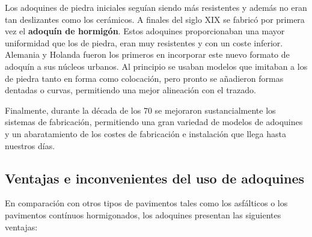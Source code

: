 Los adoquines de piedra iniciales seguían siendo más resistentes y además no eran tan deslizantes como los cerámicos. A finales del siglo XIX se fabricó por primera vez el \textbf{adoquín de hormigón}. Estos adoquines proporcionaban una mayor uniformidad que los de piedra, eran muy resistentes y con un coste inferior. Alemania y Holanda fueron los primeros en incorporar este nuevo formato de adoquín a sus núcleos urbanos. Al principio se usaban modelos que imitaban a los de piedra tanto en forma como colocación, pero pronto se añadieron formas dentadas o curvas, permitiendo una mejor alineación con el trazado.

Finalmente, durante la década de los 70 se mejoraron sustancialmente los sistemas de fabricación, permitiendo una gran variedad de modelos de adoquines y un abaratamiento de los costes de fabricación e instalación que llega hasta nuestros días.

\subsection{Ventajas e inconvenientes del uso de adoquines}\label{sec:ventajas}

En comparación con otros tipos de pavimentos tales como los asfálticos o los pavimentos contínuos hormigonados, los adoquines presentan las siguientes ventajas:

